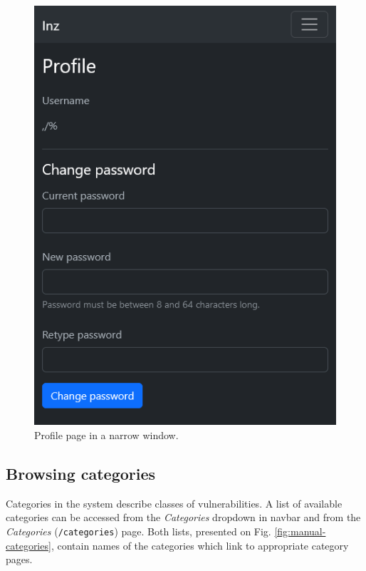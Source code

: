 \begin{figure}
    \centering
    \includegraphics{img/manual-profile.png}
    \caption{Profile page in a narrow window.}
    \label{fig:manual-profile}
\end{figure}

\subsection{Browsing categories}

Categories in the system describe classes of vulnerabilities. A list of available categories can be accessed from the \textit{Categories} dropdown in navbar and from the \textit{Categories} (\texttt{/categories}) page. Both lists, presented on Fig. \ref{fig:manual-categories}, contain names of the categories which link to appropriate category pages.

